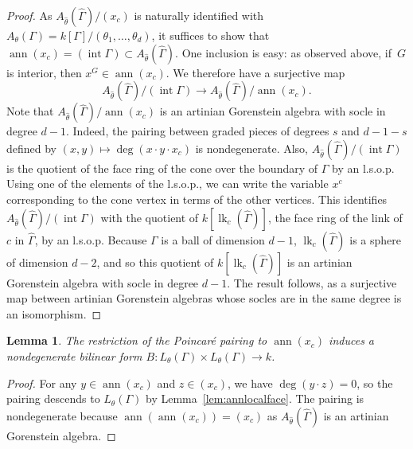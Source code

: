 \documentclass[11pt]{article}
\newtheorem{lemm}[theo]{Lemma}
\theoremstyle{definition}
\numberwithin{equation}{section}
\numberwithin{equation}{section}
\begin{document}
\begin{proof}
As $A_{\hat{\theta}}(\hat{\Gamma})/(x_c)$ is naturally identified with $A_{\theta}(\Gamma) = k[\Gamma]/(\theta_1, \dotsc, \theta_d)$, it suffices to show that $\operatorname{ann}(x_c) = (\operatorname{int} \Gamma) \subset A_{\hat{\theta}}(\hat{\Gamma})$.
One inclusion is easy: 
as observed above, if~$G$ is interior, then $x^G \in \operatorname{ann}(x_c)$.
We therefore have a surjective map 
$$A_{\hat{\theta}}(\hat{\Gamma})/(\operatorname{int} \Gamma) \to A_{\hat{\theta}}(\hat{\Gamma})/\operatorname{ann}(x_c).$$
Note that $A_{\hat{\theta}}(\hat{\Gamma})/\operatorname{ann}(x_c)$ is an artinian Gorenstein algebra with socle in degree $d-1$. 
Indeed, the pairing 
between graded pieces of degrees $s$ and $d - 1 - s$ defined by
$(x, y) \mapsto \deg(x \cdot y \cdot x_c)$ is nondegenerate. 
Also, 
$A_{\hat{\theta}}(\hat{\Gamma})/(\operatorname{int} \Gamma)$
is the quotient of the face ring of the cone over the boundary of $\Gamma$ by an l.s.o.p. 
Using one of the elements of the l.s.o.p., we can write the variable $x^c$ corresponding to the cone vertex in terms of the other vertices. 
This identifies $A_{\hat{\theta}}(\hat{\Gamma})/(\operatorname{int} \Gamma)$ with the quotient of $k[\operatorname{lk}_{c}(\hat{\Gamma})]$, the face ring of the link of $c$ in $\hat{\Gamma}$, by an l.s.o.p. 
Because ${\Gamma}$ is a ball of dimension $d-1$, $\operatorname{lk}_c(\hat{\Gamma})$ is a sphere of dimension $d-2$, and so this quotient of $k[\operatorname{lk}_{c}(\hat{\Gamma})]$ is an artinian Gorenstein algebra with socle in degree $d-1$. The result follows, as a surjective map between artinian Gorenstein algebras whose socles are in the same degree is an isomorphism. 
\end{proof}

\begin{lemm}
The restriction of the Poincar\'{e} pairing to $\operatorname{ann}(x_c)$ induces a nondegenerate bilinear form $B \colon L_{\theta}(\Gamma) \times L_{\theta}(\Gamma) \to k$.
\end{lemm}

\begin{proof}
For any $y \in \operatorname{ann}(x_c)$ and $z \in (x_c)$, we have $\deg(y \cdot z) = 0$, so the pairing descends to $L_{\theta}(\Gamma)$ by Lemma~\ref{lem:annlocalface}. The pairing is nondegenerate because $\operatorname{ann}(\operatorname{ann}(x_c)) = (x_c)$ as $A_{\hat{\theta}}(\hat{\Gamma})$ is an artinian Gorenstein algebra. 
\end{proof}
\end{document}
